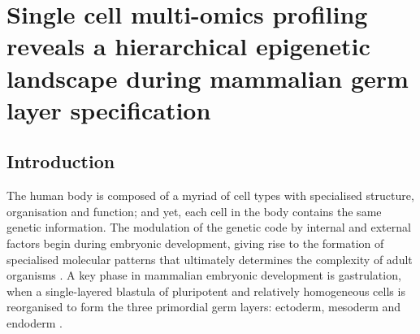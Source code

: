\graphicspath{{Chapter3/Figs/}}

\chapter{Single cell multi-omics profiling reveals a hierarchical epigenetic landscape during mammalian germ layer specification}

\section{Introduction}

The human body is composed of a myriad of cell types with specialised structure, organisation and function; and yet, each cell in the body contains the same genetic information. The modulation of the genetic code by internal and external factors begin during embryonic development, giving rise to the formation of specialised molecular patterns that ultimately determines the complexity of adult organisms \cite{Rosalind2018}.
A key phase in mammalian embryonic development is gastrulation, when a single-layered blastula of pluripotent and relatively homogeneous cells is reorganised to form the three primordial germ layers: ectoderm, mesoderm and endoderm \cite{Tam1997, Solnica-Krezel2012, Tam2007}.



